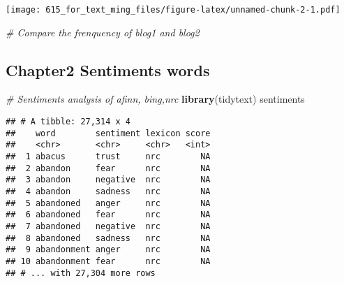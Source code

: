 \documentclass[]{article}
\newenvironment{Shaded}{\begin{snugshade}}{\end{snugshade}}
\newcommand{\KeywordTok}[1]{\textcolor[rgb]{0.13,0.29,0.53}{\textbf{{#1}}}}
\newcommand{\DataTypeTok}[1]{\textcolor[rgb]{0.13,0.29,0.53}{{#1}}}
\newcommand{\DecValTok}[1]{\textcolor[rgb]{0.00,0.00,0.81}{{#1}}}
\newcommand{\StringTok}[1]{\textcolor[rgb]{0.31,0.60,0.02}{{#1}}}
\newcommand{\CommentTok}[1]{\textcolor[rgb]{0.56,0.35,0.01}{\textit{{#1}}}}
\newcommand{\OtherTok}[1]{\textcolor[rgb]{0.56,0.35,0.01}{{#1}}}
\newcommand{\NormalTok}[1]{{#1}}
\begin{document}
\begin{Shaded}
\end{Shaded}

\texttt{[image: 615\_for\_text\_ming\_files/figure-latex/unnamed-chunk-2-1.pdf]}

\begin{Shaded}
\begin{Highlighting}[]
\CommentTok{# Compare the frenquency of blog1 and blog2}
\end{Highlighting}
\end{Shaded}

\subsection{Chapter2 Sentiments words}\label{chapter2-sentiments-words}

\begin{Shaded}
\begin{Highlighting}[]
\CommentTok{# Sentiments analysis of afinn, bing,nrc}
\KeywordTok{library}\NormalTok{(tidytext)}
\NormalTok{sentiments}
\end{Highlighting}
\end{Shaded}

\begin{verbatim}
## # A tibble: 27,314 x 4
##    word        sentiment lexicon score
##    <chr>       <chr>     <chr>   <int>
##  1 abacus      trust     nrc        NA
##  2 abandon     fear      nrc        NA
##  3 abandon     negative  nrc        NA
##  4 abandon     sadness   nrc        NA
##  5 abandoned   anger     nrc        NA
##  6 abandoned   fear      nrc        NA
##  7 abandoned   negative  nrc        NA
##  8 abandoned   sadness   nrc        NA
##  9 abandonment anger     nrc        NA
## 10 abandonment fear      nrc        NA
## # ... with 27,304 more rows
\end{verbatim}
\end{document}
